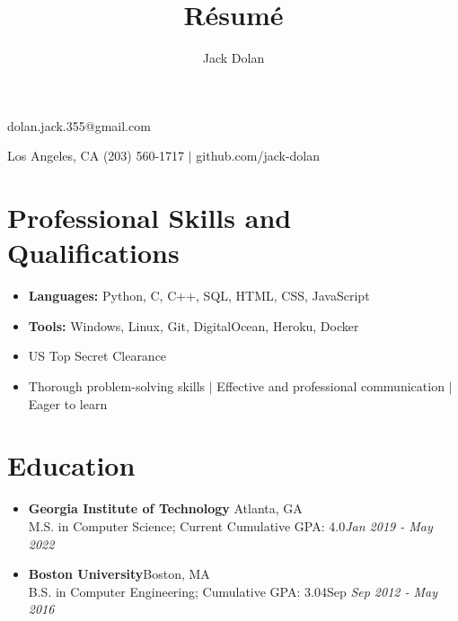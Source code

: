 \documentclass{article}
\makeatletter
\renewcommand{\maketitle}{ 
{\huge\bfseries\theauthor}\hfill dolan.jack.355@gmail.com 

\vspace{0.2em} 

Los Angeles, CA \hfill (203) 560-1717 $|$ github.com/jack-dolan
}
\makeatother
\begin{document}
 
\title{R\'esum\'e} 
\author{Jack Dolan} 
\maketitle
{}


\section{Professional Skills and Qualifications} \begin{itemize}
    \itemsep0em
    \item \textbf{Languages:} Python, C, C++, SQL, HTML, CSS, JavaScript
    \item \textbf{Tools:} Windows, Linux, Git, DigitalOcean, Heroku, Docker
    \item US Top Secret Clearance
    \item Thorough problem-solving skills $|$ Effective and professional communication $|$ Eager to learn \end{itemize} 


\section{Education} \begin{itemize}
    \itemsep0.2em
    \item \textbf{Georgia Institute of Technology} \hfill Atlanta, GA\\M.S. in Computer Science; Current Cumulative GPA: 4.0\hfill \emph{Jan 2019 - May 2022}
    \item \textbf{Boston University}\hfill Boston, MA\\B.S. in Computer Engineering; Cumulative GPA: 3.04\hfill Sep \emph{Sep 2012 - May 2016} \end{itemize} 
\end{document}

